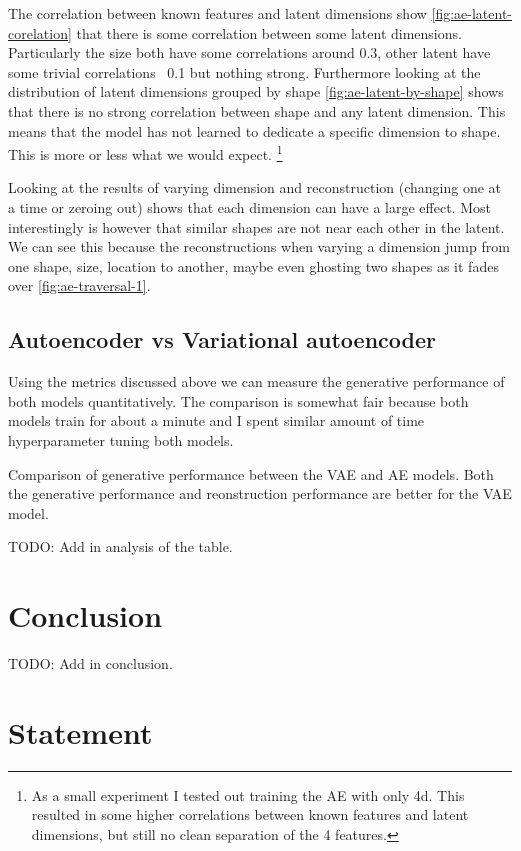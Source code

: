 \documentclass[conference,a4paper]{IEEEtran}
\newcommand{\centertable}[2]{
    \begin{table}[htbp]
        \centering
        \caption{#2}
        
        \label{tab:#1}
    \end{table}
}
\begin{document}
The correlation between known features and latent dimensions show \ref{fig:ae-latent-corelation} that there is some  correlation between some latent dimensions. Particularly the size both have some correlations around 0.3, other latent have some trivial correlations ~0.1 but nothing strong. Furthermore looking at the distribution of latent dimensions grouped by shape \ref{fig:ae-latent-by-shape} shows that there is no strong correlation between shape and any latent dimension. This means that the model has not learned to dedicate a specific dimension to shape. This is more or less what we would expect. \footnote{As a small experiment I tested out training the AE with only 4d. This resulted in some higher correlations between known features and latent dimensions, but still no clean separation of the 4 features.}

Looking at the results of varying dimension and reconstruction (changing one at a time or zeroing out) shows that each dimension can have a large effect. Most interestingly is however that similar shapes are not near each other in the latent. We can see this because the reconstructions when varying a dimension jump from one shape, size, location to another, maybe even ghosting two shapes as it fades over \ref{fig:ae-traversal-1}.

\subsection{Autoencoder vs Variational autoencoder}

Using the metrics discussed above we can measure the generative performance of both models quantitatively. The comparison is somewhat fair because both models train for about a minute and I spent similar amount of time hyperparameter tuning both models.

\centertable{ae-vs-vae}{Comparison of generative performance between the VAE and AE models. Both the generative performance and reonstruction performance are better for the VAE model.}

TODO: Add in analysis of the table.

\section{Conclusion}

TODO: Add in conclusion.

\newpage
\section*{Statement}
\end{document}
